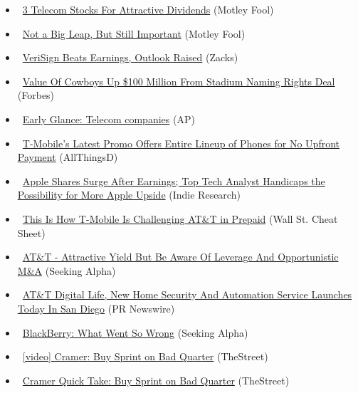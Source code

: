 \documentclass[11pt,asymmetric]{article}
\begin{document}
\begin{itemize}
\item\ \href{http://beta.fool.com/ishtiaqahmed/2013/07/25/three-telecom-stocks-for-attractive-dividends/40829/?source=eogyholnk0000001}{3 Telecom Stocks For Attractive Dividends} (Motley Fool)
\item\ \href{http://beta.fool.com/reubengbrewer/2013/07/26/not-a-big-leap-but-still-important/41640/?source=eogyholnk0000001}{Not a Big Leap, But Still Important} (Motley Fool)
\item\ \href{http://finance.yahoo.com/news/verisign-beats-earnings-outlook-raised-152001947.html}{VeriSign Beats Earnings, Outlook Raised} (Zacks)
\item\ \href{http://www.forbes.com/sites/mikeozanian/2013/07/26/value-of-cowboys-up-100-million-from-stadium-naming-rights-deal/?partner=yahootix}{Value Of Cowboys Up \$100 Million From Stadium Naming Rights Deal} (Forbes)
\item\ \href{http://finance.yahoo.com/news/early-glance-telecom-companies-143418648.html}{Early Glance: Telecom companies} (AP)
\item\ \href{http://allthingsd.com/20130726/t-mobile-promotion-offers-entire-lineup-of-phones-for-no-upfront-payment/?reflink=ATD_yahoo_ticker}{T-Mobile's Latest Promo Offers Entire Lineup of Phones for No Upfront Payment} (AllThingsD)
\item\ \href{http://finance.yahoo.com/news/apple-shares-surge-earnings-top-132200820.html}{Apple Shares Surge After Earnings; Top Tech Analyst Handicaps the Possibility for More Apple Upside} (Indie Research)
\item\ \href{http://wallstcheatsheet.com/stocks/this-is-how-t-mobile-is-challenging-att-in-prepaid.html/?ref=YF}{This Is How T-Mobile Is Challenging AT\&T in Prepaid} (Wall St. Cheat Sheet)
\item\ \href{http://seekingalpha.com/article/1575342-at-t-attractive-yield-but-be-aware-of-leverage-and-opportunistic-m-a?source=yahoo}{AT\&T - Attractive Yield But Be Aware Of Leverage And Opportunistic M\&A} (Seeking Alpha)
\item\ \href{http://finance.yahoo.com/news/t-digital-life-home-security-120000253.html}{AT\&T Digital Life, New Home Security And Automation Service Launches Today In San Diego} (PR Newswire)
\item\ \href{http://seekingalpha.com/article/1575292-blackberry-what-went-so-wrong?source=yahoo}{BlackBerry: What Went So Wrong} (Seeking Alpha)
\item\ \href{http://www.thestreet.com/_yahoo/story/11989416/1/cramer-buy-sprint-on-bad-quarter.html?cm_ven=YAHOOV&cm_cat=FREE&cm_ite=NA}{[video] Cramer: Buy Sprint on Bad Quarter} (TheStreet)
\item\ \href{http://www.thestreet.com/story/11989816/1/cramer-quick-take-buy-sprint-on-bad-quarter.html?puc=yahoo&cm_ven=YAHOO}{Cramer Quick Take: Buy Sprint on Bad Quarter} (TheStreet)
\end{itemize}
\end{document}
